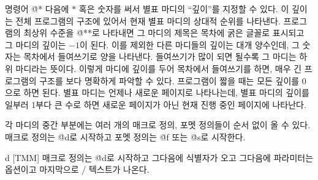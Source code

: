 \more
명령어 \.{@*} 다음에 $*$ 혹은 숫자를 써서 별표 마디의 ``깊이''를 지정할 수 있다. 이 깊이는
전체 프로그램의 구조에 있어서 현재 별표 마디의 상대적 순위를 나타낸다. 프로그램의 최상위 수준을
\.{@**}로 나타내면 그 마디의 제목은 목차에 굵은 글꼴로 표시되고 그 마디의 깊이는 $-1$이 된다.
이를 제외한 다른 마디들의 깊이는 대개 양수인데, 그 숫자는 목차에서 들여쓰기로 양을 나타낸다.
들여쓰기가 많이 되면 될수록 그 마디는 하위 마디라는 뜻이다. 이렇게 마디에 깊이를 두어 목차에서
들여쓰기를 하면, 매우 긴 프로그램의 구조를 보다 명확하게 파악할 수 있다. 프로그램이 짧을 때는
모든 깊이를 0으로 하면 된다. 별표 마디는 언제나 새로운 페이지로 나타나는데, 별표 마디의 깊이를
일부러 1부다 큰 수로 하면 새로운 페이지가 아닌 현재 진행 중인 페이지에 나타난다.
 
\subsec
각 마디의 중간 부분에는 여러 개의 매크로 정의, 포멧 정의들이 순서 없이 올 수 있다. 매크로
정의는 \.{@d}로 시작하고 포멧 정의는 \.{@f} 또는 \.{@s}로 시작한다.

\@{d} [TM\to M] 매크로 정의는 \.{@d}로 시작하고 그다음에 식별자가 오고 그다음에 파라미터는
옵션이고 마지막으로 \CEE/ 텍스트가 나온다. 

